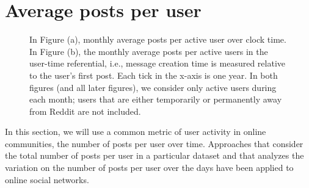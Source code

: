 
\section{Average posts per user}

\begin{figure*}[!tb]
\centering
{}
\caption{In Figure (a), monthly average posts per active user over clock time. In Figure (b), the monthly average posts per active users in the user-time referential, i.e., message creation time is measured relative to the user's first post.  Each tick in the x-axis is one year.  In both figures (and all later figures), we consider only active users during each month; users that are either temporarily or permanently away from Reddit are not included.}
\label{fig:overall_posts}
\end{figure*}

In this section, we will use a common metric of user activity in online communities, the number of posts per user over time. Approaches that consider the total number of posts per user in a particular dataset \cite{Gruhl2004} and that analyzes the variation on the number of posts per user over the days \cite{Guo2009} have been applied to online social networks.

